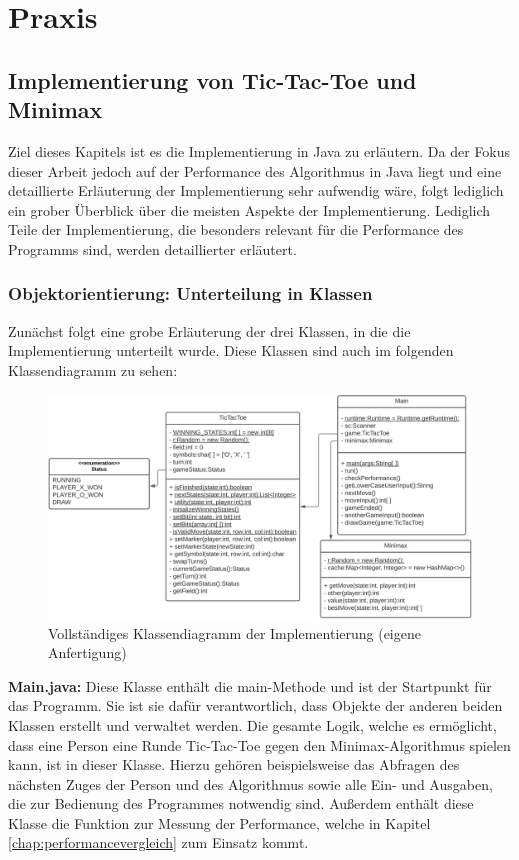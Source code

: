 \chapter{Praxis}

\section{Implementierung von Tic-Tac-Toe und Minimax}
Ziel dieses Kapitels ist es die Implementierung in Java zu erläutern. Da der Fokus dieser Arbeit jedoch auf der Performance
des Algorithmus in Java liegt und eine detaillierte Erläuterung der Implementierung sehr aufwendig wäre, folgt lediglich
ein grober Überblick über die meisten Aspekte der Implementierung. Lediglich Teile der Implementierung, die besonders relevant
für die Performance des Programms sind, werden detaillierter erläutert. 

\subsection{Objektorientierung: Unterteilung in Klassen}
Zunächst folgt eine grobe Erläuterung der drei Klassen, in die die Implementierung unterteilt wurde.
Diese Klassen sind auch im folgenden Klassendiagramm zu sehen:
\begin{figure}[H]
    \centering
    \includegraphics[scale=0.217]{img/uml_diagram.png}
    \caption[Vollständiges Klassendiagramm der Implementierung]{Vollständiges Klassendiagramm der Implementierung (eigene Anfertigung)}
    \label{fig:uml}
\end{figure}

\textbf{Main.java:} Diese Klasse enthält die main-Methode und ist der Startpunkt für das Programm. Sie ist sie dafür
verantwortlich, dass Objekte der anderen beiden Klassen erstellt und verwaltet werden. Die gesamte Logik, welche es ermöglicht, dass 
eine Person eine Runde Tic-Tac-Toe gegen den Minimax-Algorithmus spielen kann, ist in dieser Klasse. Hierzu gehören beispielsweise 
das Abfragen des nächsten Zuges der Person und des Algorithmus sowie alle Ein- und Ausgaben, die zur Bedienung des Programmes notwendig sind. 
Außerdem enthält diese Klasse die Funktion zur Messung der Performance, welche in Kapitel \ref{chap:performancevergleich} zum Einsatz kommt.

